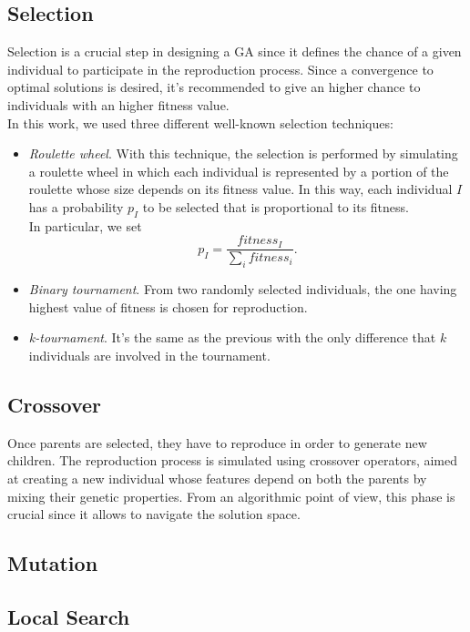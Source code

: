 \documentclass[opre,nonblindrev]{informs3} %
\begin{document}
\subsection{Selection}
Selection is a crucial step in designing a GA since it defines the chance of a given individual to participate in the reproduction process. Since a convergence to optimal solutions is desired, it's recommended to give an higher chance to individuals with an higher fitness value.\\
In this work, we used three different well-known selection techniques:
\begin{itemize}
	\item \textit{Roulette wheel}. With this technique, the selection is performed by simulating a roulette wheel in which each individual is represented by a portion of the roulette whose size depends on its fitness value. In this way, each individual $I$ has a probability $p_I$ to be selected that is proportional to its fitness.\\In particular, we set $$p_I = \frac{fitness_I}{\sum_{i}fitness_i}.$$
	\item \textit{Binary tournament}. From two randomly selected individuals, the one having highest value of fitness is chosen for reproduction.
	\item \textit{k-tournament}. It's the same as the previous with the only difference that $k$ individuals are involved in the tournament. 
\end{itemize}
\subsection{Crossover}
Once parents are selected, they have to reproduce in order to generate new children. The reproduction process is simulated using crossover operators, aimed at creating a new individual whose features depend on both the parents by mixing their genetic properties. From an algorithmic point of view, this phase is crucial since it allows to navigate the solution space. 
\subsection{Mutation}
\subsection{Local Search}
\end{document}
